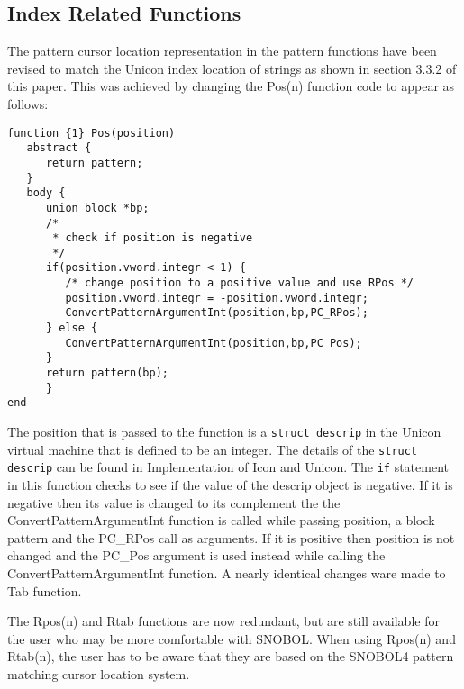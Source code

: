 \documentclass{article}
\begin{document}
\subsection{Index Related Functions}
The pattern cursor location representation in the pattern functions have been revised to match the Unicon index location of strings as shown in section 3.3.2 of this paper.  This was achieved by changing the Pos(n) function code to appear as follows:
\begin{verbatim}
function {1} Pos(position)
   abstract {
      return pattern;
   }
   body {
      union block *bp;
      /*
       * check if position is negative
       */
      if(position.vword.integr < 1) {
         /* change position to a positive value and use RPos */
         position.vword.integr = -position.vword.integr;
         ConvertPatternArgumentInt(position,bp,PC_RPos);
      } else {
         ConvertPatternArgumentInt(position,bp,PC_Pos);
      }
      return pattern(bp);
      }
end
\end{verbatim}
The position that is passed to the function is a \texttt{struct descrip} in the Unicon virtual machine that is defined to be an integer.  The details of the \texttt{struct descrip} can be found in Implementation of Icon and Unicon. \cite{JefferyImp}  The \texttt{if} statement in this function checks to see if the value of the descrip object is negative.  If it is negative then its value is changed to its complement the the ConvertPatternArgumentInt function is called while passing position, a block pattern and the PC\_RPos call as arguments.  If it is positive then position is not changed and the PC\_Pos argument is used instead while calling the ConvertPatternArgumentInt function.  A nearly identical changes ware made to Tab function.

The Rpos(n) and Rtab functions are now redundant, but are still available for the user who may be more comfortable with SNOBOL.  When using Rpos(n) and Rtab(n), the user has to be aware that they are based on the SNOBOL4 pattern matching cursor location system.
\end{document}
